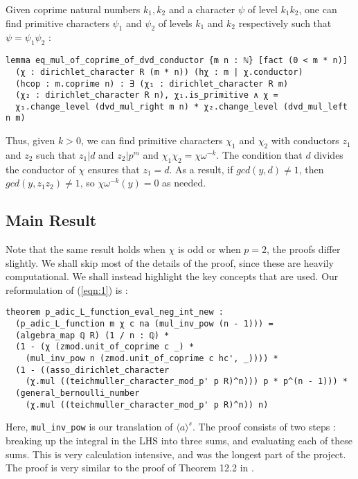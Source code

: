 \documentclass[a4paper,UKenglish,cleveref, autoref, thm-restate]{lipics-v2021}
\newcommand{\lean}[1]{\texttt{#1}\xspace} %
\begin{document}
Given coprime natural numbers $k_1, k_2$ and a character $\psi$ of level $k_1 k_2$, one can find primitive characters 
$\psi_1$ and $\psi_2$ of levels $k_1$ and $k_2$ respectively such that $\psi = \psi_1 \psi_2$ : 
\begin{lstlisting}
lemma eq_mul_of_coprime_of_dvd_conductor {m n : ℕ} [fact (0 < m * n)] 
  (χ : dirichlet_character R (m * n)) (hχ : m | χ.conductor) 
  (hcop : m.coprime n) : ∃ (χ₁ : dirichlet_character R m) 
  (χ₂ : dirichlet_character R n), χ₁.is_primitive ∧ χ = 
  χ₁.change_level (dvd_mul_right m n) * χ₂.change_level (dvd_mul_left n m) 
\end{lstlisting}
Thus, given $k > 0$, we can find primitive characters $\chi_1$ and $\chi_2$ with conductors $z_1$ and $z_2$ such that 
$z_1 | d$ and $z_2 | p^m$ and $\chi_1 \chi_2 = \chi \omega^{-k}$. The condition that $d$ divides the conductor of $\chi$ ensures 
that $z_1 = d$. As a result, if $gcd (y, d) \ne 1$, then $gcd (y, z_1 z_2) \ne 1$, so $\chi \omega^{-k} (y) = 0$ as needed.

\subsection{Main Result}
Note that the same result holds when $\chi$ is odd or when $p = 2$, the proofs differ slightly. We shall 
skip most of the details of the proof, since these are heavily computational. We shall instead highlight the key concepts 
that are used. Our reformulation of (\ref{eqn:1}) is :
\begin{lstlisting}
theorem p_adic_L_function_eval_neg_int_new :
  (p_adic_L_function m χ c na (mul_inv_pow (n - 1))) = 
  (algebra_map ℚ R) (1 / n : ℚ) *
  (1 - (χ (zmod.unit_of_coprime c _) * 
    (mul_inv_pow n (zmod.unit_of_coprime c hc', _)))) * 
  (1 - ((asso_dirichlet_character 
    (χ.mul ((teichmuller_character_mod_p' p R)^n))) p * p^(n - 1))) * 
  (general_bernoulli_number 
    (χ.mul ((teichmuller_character_mod_p' p R)^n)) n) 
\end{lstlisting}
Here, \lean{mul\_inv\_pow} is our translation of $\langle a \rangle ^s$. \newline
The proof consists of two steps : breaking up the integral in the LHS into three sums, 
and evaluating each of these sums. This is very calculation intensive, and was the longest part of the project. 
The proof is very similar to the proof of Theorem 12.2 in \cite{cyc}. 
\end{document}
